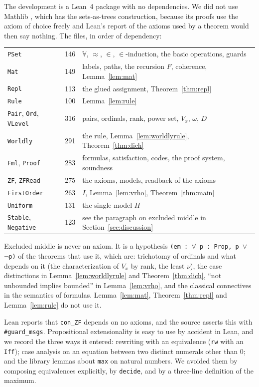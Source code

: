 \documentclass[10pt]{article}
\theoremstyle{definition}
\theoremstyle{remark}
\newcommand{\V}{\mathbb{V}}
\newcommand{\lean}[1]{\texttt{#1}}
\begin{document}
The development is a Lean~4 package with no dependencies. We did not
use Mathlib \cite{mathlib}, which has the sets-as-trees construction,
because its proofs use the axiom of choice freely and Lean's report of
the axioms used by a theorem would then say nothing. The files, in order
of dependency:
\begin{center}
\begin{tabular}{lrl}
\lean{PSet} & 146 & $\V$, $\approx$, $\in$, $\in$-induction, the basic operations, guards\\
\lean{Mat} & 149 & labels, paths, the recursion $F$, coherence, Lemma~\ref{lem:mat}\\
\lean{Repl} & 113 & the glued assignment, Theorem~\ref{thm:repl}\\
\lean{Rule} & 100 & Lemma~\ref{lem:rule}\\
\lean{Pair}, \lean{Ord}, \lean{VLevel} & 316 & pairs, ordinals, rank, power set, $V_x$, $\omega$, $D$\\
\lean{Worldly} & 291 & the rule, Lemma~\ref{lem:worldlyrule}, Theorem~\ref{thm:dich}\\
\lean{Fml}, \lean{Proof} & 283 & formulas, satisfaction, codes, the proof system, soundness\\
\lean{ZF}, \lean{ZFRead} & 275 & the axioms, models, readback of the axioms\\
\lean{FirstOrder} & 263 & $I$, Lemma~\ref{lem:vrho}, Theorem~\ref{thm:main}\\
\lean{Uniform} & 131 & the single model $H$\\
\lean{Stable}, \lean{Negative} & 123 & see the paragraph on excluded middle in Section~\ref{sec:discussion}
\end{tabular}
\end{center}
Excluded middle is never an axiom. It is a hypothesis
\lean{(em :\ $\forall$ p :\ Prop, p $\vee$ $\neg$p)} of the theorems that use it, which are:
trichotomy of ordinals and what depends on it (the characterization of
$V_x$ by rank, the least $\nu$), the case distinctions in
Lemma~\ref{lem:worldlyrule} and Theorem~\ref{thm:dich}, ``not unbounded
implies bounded'' in Lemma~\ref{lem:vrho}, and the classical connectives
in the semantics of formulas. Lemma~\ref{lem:mat},
Theorem~\ref{thm:repl} and Lemma~\ref{lem:rule} do not use it.

Lean reports that \lean{con\_ZF} depends on no axioms, and the source
asserts this with \lean{\#guard\_msgs}. Propositional extensionality is easy
to use by accident in Lean, and we record the three ways it entered: rewriting
with an equivalence (\lean{rw} with an \lean{Iff}); case analysis on an
equation between two distinct numerals other than $0$; and the library
lemmas about \lean{max} on natural numbers. We avoided them by
composing equivalences explicitly, by \lean{decide}, and by a
three-line definition of the maximum.
\end{document}
